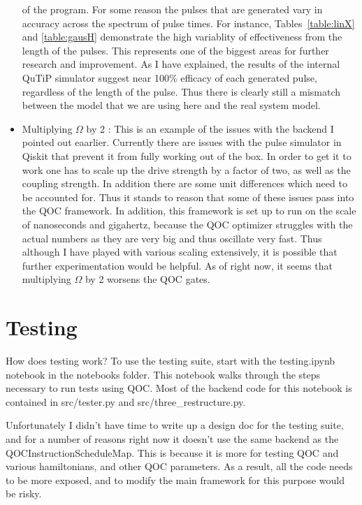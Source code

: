 \documentclass[12pt]{article}
\begin{document}
\begin{itemize}
    of the program. For some reason the pulses that are generated vary in
    accuracy across the spectrum of pulse times. For instance,
    Tables~\ref{table:linX} and \ref{table:gausH} demonstrate the high
    variablity of effectiveness from the length of the pulses.  This represents
    one of the biggest areas for further research and improvement. As I have
    explained, the results of the internal QuTiP simulator suggest near 100\%
    efficacy of each generated pulse, regardless of the length of the pulse.
    Thus there is clearly still a mismatch between the model that we are using
    here and the real system model.
    \item Multiplying $\Omega$ by 2 : This is an example of the issues with the
    backend I pointed out eaarlier. Currently there are issues with the pulse
    simulator in Qiskit that prevent it from fully working out of the box. In
    order to get it to work one has to scale up the drive strength by a factor
    of two, as well as the coupling strength. In addition there are some unit
    differences which need to be accounted for. Thus it stands to reason that
    some of these issues pass into the QOC framework. In addition, this
    framework is set up to run on the scale of nanoseconds and gigahertz,
    because the QOC optimizer struggles with the actual numbers as they are very
    big and thus oscillate very fast. Thus although I have played with various
    scaling extensively, it is possible that further experimentation would be
    helpful. As of right now, it seems that multiplying $\Omega$ by 2 worsens
    the QOC gates.
\end{itemize}

\section{Testing}\label{testing} How does testing work? To use the testing
suite, start with the testing.ipynb notebook in the notebooks folder. This
notebook walks through the steps necessary to run tests using QOC. Most of the
backend code for this notebook is contained in src/tester.py and
src/three\_restructure.py.

Unfortunately I didn't
have time to write up a design doc for the testing suite, and for a number of
reasons right now it doesn't use the same backend as the
QOCInstructionScheduleMap. This is because it is more for testing QOC and
various hamiltonians, and other QOC parameters. As a result, all the code needs
to be more exposed, and to modify the main framework for this purpose would be
risky. 
\end{document}
